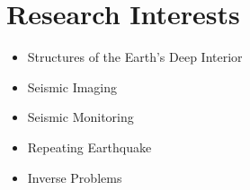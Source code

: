 \section*{Research Interests}

\begin{itemize}
\item Structures of the Earth’s Deep Interior
\item Seismic Imaging
\item Seismic Monitoring
\item Repeating Earthquake
\item Inverse Problems
\end{itemize}
